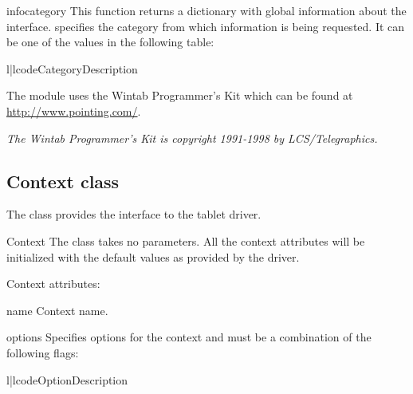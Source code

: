 \begin{funcdesc}{info}{category}
This function returns a dictionary with global information about the 
interface.  specifies the category from which information
is being requested. It can be one of the values in the following table:

\begin{tableii}{l|l}{code}{Category}{Description}
\end{tableii}
\end{funcdesc}


\begin{notice}[note]
The module uses the Wintab{\texttrademark} Programmer's Kit which can be
found at \url{http://www.pointing.com/}.

{\em The Wintab Programmer's Kit is copyright 1991-1998 by LCS/Telegraphics.}
\end{notice}

\subsection{Context class}

The  class provides the interface to the tablet driver.

\begin{classdesc}{Context}{}
The class takes no parameters. All the context attributes will be
initialized with the default values as provided by the driver.
\end{classdesc}

Context attributes:

\begin{memberdesc}{name}
Context name.
\end{memberdesc}

\begin{memberdesc}{options}
Specifies options for the context and must be a combination of the following
flags:

\begin{tableii}{l|l}{code}{Option}{Description}
\end{tableii}
\end{memberdesc}

